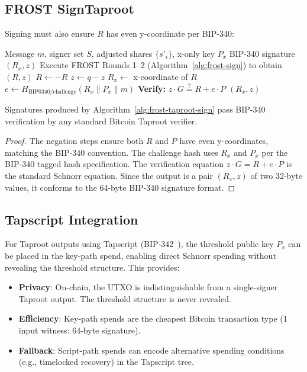 \subsection{FROST SignTaproot}

Signing must also ensure $R$ has even y-coordinate per BIP-340:

\begin{algorithm}[H]
\caption{FROST SignTaproot}
\label{alg:frost-taproot-sign}
\begin{algorithmic}[1]
\Require Message $m$, signer set $S$, adjusted shares $\{s'_i\}$, x-only key $P_x$
\Ensure BIP-340 signature $(R_x, z)$
\State Execute FROST Rounds 1--2 (Algorithm~\ref{alg:frost-sign}) to obtain $(R, z)$
  \State $R \gets -R$
  \State $z \gets q - z$ 
\EndIf
\State $R_x \gets$ x-coordinate of $R$
\State $e \gets H_{\text{BIP0340/challenge}}(R_x \| P_x \| m)$
\State \textbf{Verify:} $z \cdot G \stackrel{?}{=} R + e \cdot P$
\State \Return $(R_x, z)$ 
\end{algorithmic}
\end{algorithm}

\begin{proposition}
\label{prop:taproot}
Signatures produced by Algorithm~\ref{alg:frost-taproot-sign} pass BIP-340 verification
by any standard Bitcoin Taproot verifier.
\end{proposition}

\begin{proof}
The negation steps ensure both $R$ and $P$ have even y-coordinates, matching the
BIP-340 convention. The challenge hash uses $R_x$ and $P_x$ per the BIP-340 tagged
hash specification. The verification equation $z \cdot G = R + e \cdot P$ is the
standard Schnorr equation. Since the output is a pair $(R_x, z)$ of two 32-byte
values, it conforms to the 64-byte BIP-340 signature format.
\end{proof}

\subsection{Tapscript Integration}

For Taproot outputs using Tapscript (BIP-342~\cite{bip342}), the threshold public key
$P_x$ can be placed in the key-path spend, enabling direct Schnorr spending without
revealing the threshold structure. This provides:

\begin{itemize}[nosep]
  \item \textbf{Privacy}: On-chain, the UTXO is indistinguishable from a single-signer
    Taproot output. The threshold structure is never revealed.
  \item \textbf{Efficiency}: Key-path spends are the cheapest Bitcoin transaction type
    (1 input witness: 64-byte signature).
  \item \textbf{Fallback}: Script-path spends can encode alternative spending conditions
    (e.g., timelocked recovery) in the Tapscript tree.
\end{itemize}

